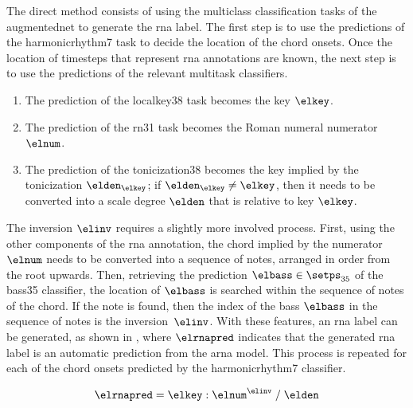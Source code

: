 

The direct method consists of using the multiclass
classification tasks of the \gls{augmentednet} to generate
the \gls{rna} label. The first step is to use the
predictions of the \gls{harmonicrhythm7} task to decide the
location of the chord onsets. Once the location of timesteps
that represent \gls{rna} annotations are known, the next
step is to use the predictions of the relevant multitask
classifiers.

\begin{enumerate}
    \item[] The prediction of the \gls{localkey38} task
    becomes the key $\elkey$.
    \item[] The prediction of the \gls{rn31} task becomes
    the Roman numeral numerator $\elnum$.
    \item[] The prediction of the \gls{tonicization38}
    becomes the key implied by the tonicization
    $\elden_\elkey$; if $\elden_\elkey \neq \elkey$, then it
    needs to be converted into a scale degree $\elden$ that
    is relative to key $\elkey$.
\end{enumerate}

The inversion $\elinv$ requires a slightly more involved
process. First, using the other components of the \gls{rna}
annotation, the chord implied by the numerator $\elnum$
needs to be converted into a sequence of notes, arranged in
order from the root upwards. Then, retrieving the prediction
$\elbass \in \setps_{35}$ of the \gls{bass35} classifier,
the location of $\elbass$ is searched within the sequence of
notes of the chord. If the note is found, then the index of
the bass $\elbass$ in the sequence of notes is the
inversion~$\elinv$. With these features, an \gls{rna} label
can be generated, as shown in , where
$\elrnapred$ indicates that the generated \gls{rna} label is
an automatic prediction from the \gls{arna} model. This
process is repeated for each of the chord onsets predicted
by the \gls{harmonicrhythm7} classifier.

\begin{equation}
    \label{eq:rna_direct}
    \elrnapred = \elkey : \elnum^{\elinv} \; / \; \elden
\end{equation}



